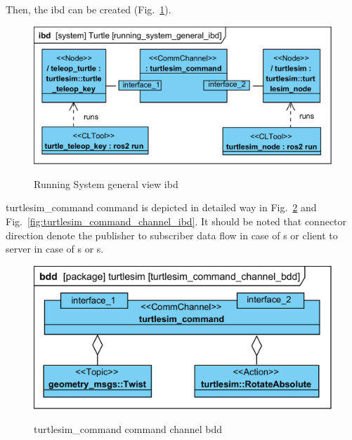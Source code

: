 \documentclass[11pt,oneside,a4paper]{report}
\begin{document}
Then, the ibd can be created (Fig.~\ref{fig:running_system_general_ibd}). 

\begin{figure}[H]
	\centering
	\begin{center}
		{\includegraphics[scale=1.0]{diagrams/running_system_general_ibd.png}}
	\end{center}
	\caption{Running System general view ibd}
	\label{fig:running_system_general_ibd}
\end{figure}

\textsf{turtlesim\_command command} \stCommChannel{} is depicted in detailed way in Fig.~\ref{fig:turtlesim_command_channel_bdd} and Fig.~\ref{fig:turtlesim_command_channel_ibd}. It should be noted that connector direction denote the publisher to subscriber data flow in case of \stTopic{}s or client to server in case of \stService{}s or \stAction{}s.


\begin{figure}[H]
	\centering
	\begin{center}
		{\includegraphics[scale=1.0]{diagrams/turtlesim_command_channel_bdd.png}}
	\end{center}
	\caption{turtlesim\_command command channel bdd}
	\label{fig:turtlesim_command_channel_bdd}
\end{figure}
\end{document}
